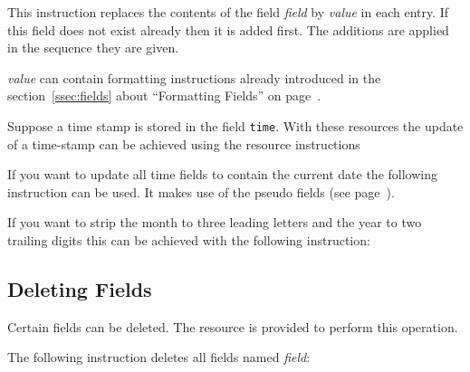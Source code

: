 \documentclass[11pt,a4paper]{scrbook}
\begin{document}
\begin{Resources}
\end{Resources}

This instruction replaces the contents of the field \textit{field} by
\textit{value} in each entry. If this field does not exist already then it is
added first. The additions are applied in the sequence they are given.

\textit{value} can contain formatting instructions already introduced in the
section~\ref{ssec:fields} about ``Formatting Fields'' on
page~\pageref{ssec:fields}.

Suppose a time stamp is stored in the field \texttt{time}.  With these
resources the update of a time-stamp can be achieved using the resource
instructions

\begin{Resources}
\end{Resources}

If you want to update all time fields to contain the current date the
following instruction can be used. It makes use of the pseudo fields (see
page~\pageref{pseudo:key}).

\begin{Resources}
\end{Resources}

If you want to strip the month to three leading letters and the year to two
trailing digits this can be achieved with the following
instruction:

\begin{Resources}
\end{Resources}

\subsection{Deleting Fields}

Certain fields can be deleted. The resource  is provided to
perform this operation.

The following instruction deletes all fields named \textit{field}:

\begin{Resources}
\end{Resources}
\end{document}
